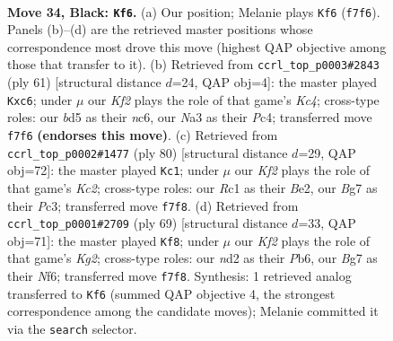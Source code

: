 \documentclass[11pt]{article}
\begin{document}
\clearpage

\begin{figure}[p]\centering
\begin{subfigure}{0.46\textwidth}\centering
\resizebox{\linewidth}{!}{%
\newchessgame
\chessboard[
  setfen={8/P4kb1/1p4p1/2pB4/6pP/n7/3NR2K/2r5 b - - 1 34},
  showmover=false,
  pgfstyle=straightmove, color=movearrow, markmove={f7-f6}
]}
\caption{}
\end{subfigure}\hfill
\begin{subfigure}{0.46\textwidth}\centering
\resizebox{\linewidth}{!}{%
\newchessgame
\chessboard[
  setfen={4r3/5p1p/2N2p2/1pk5/2p3P1/8/R4K1P/3B4 b - - 0 31},
  showmover=false,
  pgfstyle=straightmove, color=movearrow, markmove={c5-c6}
]}
\caption{}
\end{subfigure}
\\[4pt]
\begin{subfigure}{0.46\textwidth}\centering
\resizebox{\linewidth}{!}{%
\newchessgame
\chessboard[
  setfen={3r1k2/6pp/8/N3P3/8/1PP1n1PP/2K1B3/8 w - - 1 41},
  showmover=false,
  pgfstyle=straightmove, color=movearrow, markmove={c2-c1}
]}
\caption{}
\end{subfigure}\hfill
\begin{subfigure}{0.46\textwidth}\centering
\resizebox{\linewidth}{!}{%
\newchessgame
\chessboard[
  setfen={8/p5kp/1p3n2/4N1R1/P2P4/3K4/7P/2r5 b - - 2 35},
  showmover=false,
  pgfstyle=straightmove, color=movearrow, markmove={g7-f8}
]}
\caption{}
\end{subfigure}
\caption{\textbf{Move 34, Black: \texttt{Kf6}.} (a) Our position; Melanie plays \texttt{Kf6} (\texttt{f7f6}). Panels (b)--(d) are the retrieved master positions whose correspondence most drove this move (highest QAP objective among those that transfer to it). (b) Retrieved from \texttt{ccrl\_top\_p0003\#2843} (ply 61) [structural distance $d$=24, QAP obj=4]: the master played \texttt{Kxc6}; under $\mu$ our \emph{Kf2} plays the role of that game's \emph{Kc4}; cross-type roles: our \emph{b}d5 as their \emph{n}c6, our \emph{N}a3 as their \emph{P}c4; transferred move \texttt{f7f6} \textbf{(endorses this move)}. (c) Retrieved from \texttt{ccrl\_top\_p0002\#1477} (ply 80) [structural distance $d$=29, QAP obj=72]: the master played \texttt{Kc1}; under $\mu$ our \emph{Kf2} plays the role of that game's \emph{Kc2}; cross-type roles: our \emph{R}c1 as their \emph{B}e2, our \emph{B}g7 as their \emph{P}c3; transferred move \texttt{f7f8}. (d) Retrieved from \texttt{ccrl\_top\_p0001\#2709} (ply 69) [structural distance $d$=33, QAP obj=71]: the master played \texttt{Kf8}; under $\mu$ our \emph{Kf2} plays the role of that game's \emph{Kg2}; cross-type roles: our \emph{n}d2 as their \emph{P}b6, our \emph{B}g7 as their \emph{N}f6; transferred move \texttt{f7f8}. Synthesis: 1 retrieved analog transferred to \texttt{Kf6} (summed QAP objective 4, the strongest correspondence among the candidate moves); Melanie committed it via the \texttt{search} selector.}
\label{fig:thought-m67}
\end{figure}
\end{document}
